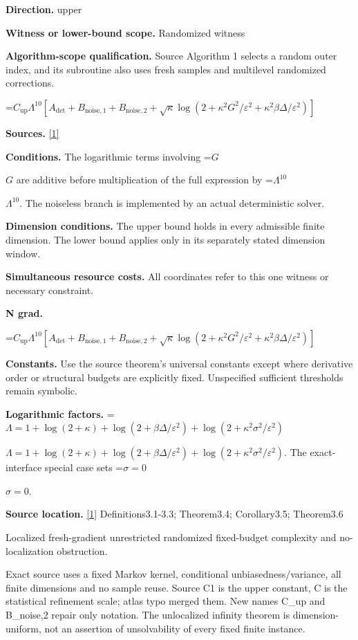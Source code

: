 \documentclass[10pt,a4paper]{article}
\newcommand{\AtlasMath}[1]{\par\begingroup\centering\setbox0=\hbox{$\displaystyle #1$}\ifdim\wd0>1.4\linewidth\typeout{ATLAS WIDE FORMULA: \the\wd0}\fi\ifdim\wd0>\linewidth\resizebox{\linewidth}{!}{\box0}\else\box0\fi\par\endgroup}
\newcommand{\AtlasInlineMath}[1]{\begingroup\setbox0=\hbox{$#1$}\ifdim\wd0>.4\linewidth\endgroup\AtlasMath{#1}\else\endgroup$#1$\fi}
\begin{document}
\textbf{Direction.} upper

\textbf{Witness or lower-bound scope.} Randomized witness

\textbf{Algorithm-scope qualification.} Source Algorithm 1 selects a random outer index, and its subroutine also uses fresh samples and multilevel randomized corrections.

\AtlasMath{C_{\mathrm{up}}\Lambda^{10}[A_{\mathrm{det}}+B_{\mathrm{noise},1}+B_{\mathrm{noise},2}+\sqrt\kappa\log(2+\kappa^2G^2/\varepsilon^2+\kappa^2\beta\Delta/\varepsilon^2)]}
\textbf{Sources.} \href{https://arxiv.org/pdf/2610.00229v2}{[1]}

\textbf{Conditions.} The logarithmic terms involving \AtlasInlineMath{G} are additive before multiplication of the full expression by \AtlasInlineMath{\Lambda^{10}}. The noiseless branch is implemented by an actual deterministic solver.

\textbf{Dimension conditions.} The upper bound holds in every admissible finite dimension. The lower bound applies only in its separately stated dimension window.

\textbf{Simultaneous resource costs.} All coordinates refer to this one witness or necessary constraint.

\textbf{N grad.}

\AtlasMath{C_{\mathrm{up}}\Lambda^{10}[A_{\mathrm{det}}+B_{\mathrm{noise},1}+B_{\mathrm{noise},2}+\sqrt\kappa\log(2+\kappa^2G^2/\varepsilon^2+\kappa^2\beta\Delta/\varepsilon^2)]}
\textbf{Constants.} Use the source theorem’s universal constants except where derivative order or structural budgets are explicitly fixed. Unspecified sufficient thresholds remain symbolic.

\textbf{Logarithmic factors.} \AtlasInlineMath{\Lambda=1+\log(2+\kappa)+\log(2+\beta\Delta/\varepsilon^2)+\log(2+\kappa^2\sigma^2/\varepsilon^2)}. The exact-interface special case sets \AtlasInlineMath{\sigma=0}.

\textbf{Source location.} \href{https://arxiv.org/pdf/2610.00229v2}{[1]} Definitions3.1-3.3; Theorem3.4; Corollary3.5; Theorem3.6

Localized fresh-gradient unrestricted randomized fixed-budget complexity and no-localization obstruction.

Exact source uses a fixed Markov kernel, conditional unbiasedness/variance, all finite dimensions and no sample reuse. Source C1 is the upper constant, C is the statistical refinement scale; atlas typo merged them. New names C\_up and B\_noise,2 repair only notation. The unlocalized infinity theorem is dimension-uniform, not an assertion of unsolvability of every fixed finite instance.
\end{document}

